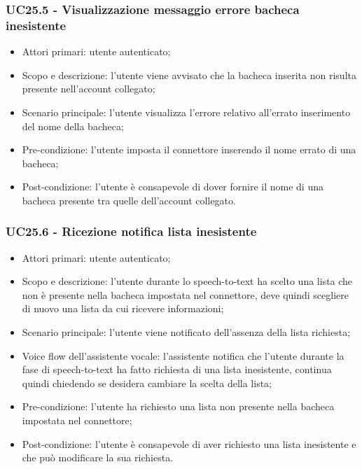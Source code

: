 \subsubsection{UC25.5 - Visualizzazione messaggio errore bacheca inesistente}
\begin{itemize}
	\item  Attori primari: utente autenticato;
	\item  Scopo e descrizione: l'utente viene avvisato che la bacheca inserita non risulta presente nell'account collegato;
	\item  Scenario principale: l'utente visualizza l'errore relativo all'errato inserimento del nome della bacheca;
	\item  Pre-condizione: l'utente imposta il connettore inserendo il nome errato di una bacheca;
	\item  Post-condizione: l'utente è consapevole di dover fornire il nome di una bacheca presente tra quelle dell'account collegato.
\end{itemize}
\subsubsection{UC25.6 - Ricezione notifica lista inesistente}
\begin{itemize}
	\item  Attori primari: utente autenticato;
	\item  Scopo e descrizione: l'utente durante lo speech-to-text ha scelto una lista che non è presente nella bacheca impostata nel connettore, deve quindi scegliere di nuovo una lista da cui ricevere informazioni;
	\item  Scenario principale: l'utente viene notificato dell'assenza della lista richiesta;
	\item  Voice flow dell'assistente vocale: l'assistente notifica che l'utente durante la fase di speech-to-text ha fatto richiesta di una lista inesistente, continua quindi chiedendo se desidera cambiare la scelta della lista;
	\item  Pre-condizione: l'utente ha richiesto una lista non presente nella bacheca impostata nel connettore;
	\item  Post-condizione: l'utente è consapevole di aver richiesto una lista inesistente e che può modificare la sua richiesta.
\end{itemize}
